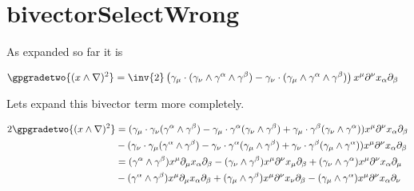 

\chapter{bivectorSelectWrong}
\label{chap:bivectorSelectWrong}
{}
\date{Sept 6, 2009}

\beginArtNoToc

As expanded so far it is

\begin{align*}
\gpgradetwo{(x \wedge \grad)^2 } &= 
\inv{2} \left( 
 \gamma_\mu \cdot (\gamma_\nu \wedge \gamma^\alpha \wedge \gamma^\beta )
-\gamma_\nu \cdot (\gamma_\mu \wedge \gamma^\alpha \wedge \gamma^\beta ) 
\right)
x^\mu \partial^\nu x_\alpha \partial_\beta
\end{align*}

Lets expand this bivector term more completely.

\begin{align*}
2 \gpgradetwo{(x \wedge \grad)^2 } 
&=
(\gamma_\mu \cdot \gamma_\nu (\gamma^\alpha \wedge \gamma^\beta ) %
-\gamma_\mu \cdot \gamma^\alpha (\gamma_\nu \wedge \gamma^\beta ) %
+\gamma_\mu \cdot \gamma^\beta (\gamma_\nu \wedge \gamma^\alpha ) ) x^\mu \partial^\nu x_\alpha \partial_\beta \\
&
- (\gamma_\nu \cdot \gamma_\mu ( \gamma^\alpha \wedge \gamma^\beta ) %
- \gamma_\nu \cdot \gamma^\alpha ( \gamma_\mu \wedge \gamma^\beta )  %
+ \gamma_\nu \cdot \gamma^\beta ( \gamma_\mu \wedge \gamma^\alpha ) )x^\mu \partial^\nu x_\alpha \partial_\beta \\
&=
(\gamma^\alpha \wedge \gamma^\beta ) x^\mu \partial_\mu x_\alpha \partial_\beta
-
(\gamma_\nu \wedge \gamma^\beta ) x^\mu \partial^\nu x_\mu \partial_\beta
+
(\gamma_\nu \wedge \gamma^\alpha ) x^\mu \partial^\nu x_\alpha \partial_\mu \\
&
- 
( \gamma^\alpha \wedge \gamma^\beta ) x^\mu \partial_\mu x_\alpha \partial_\beta
+ 
( \gamma_\mu \wedge \gamma^\beta ) x^\mu \partial^\nu x_\nu \partial_\beta
- 
( \gamma_\mu \wedge \gamma^\alpha ) x^\mu \partial^\nu x_\alpha \partial_\nu \\
\end{align*}

